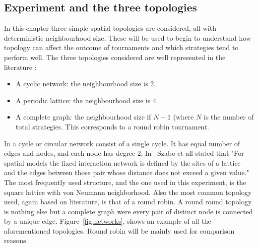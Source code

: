 


\subsection{Experiment and the three topologies}


In this chapter three simple spatial topologies are considered, all with
deterministic neighbourhood size. These will be used to begin to understand how
topology can affect the outcome of tournaments
and which strategies tend to perform well. The three topologies considered are
well represented in the literature \cite{?}:

\begin{itemize}
    \item A cyclic network: the neighbourhood size is 2. %
    \item A periodic lattice: the neighbourhood size is 4. %
    \item A complete graph: the neighbourhood size if \(N-1\) (where \(N\) is
        the number of total strategies. This corresponds to a round robin
        tournament. %
\end{itemize}

In a cycle or circular network consist of a single cycle. It has
equal number of edges and nodes, and each node has degree 2. In~\cite{Szabo2007}
Szabo et all stated that "For spatial models the fixed interaction network is
defined by the sites of a lattice and the edges between those pair whose distance
does not exceed a given value."  The most frequently used structure, and the one
used in this experiment, is the square lattice with von Neumann neighborhood.
Also the most common topology used, again based on literature, is that of a
round robin. A round round topology is nothing else but a complete
graph were every pair of distinct node is connected by a unique edge.
Figure~\ref{fig:networks}, shows an example of all the aforementioned topologies.
Round robin will be mainly used for comparison reasons.

